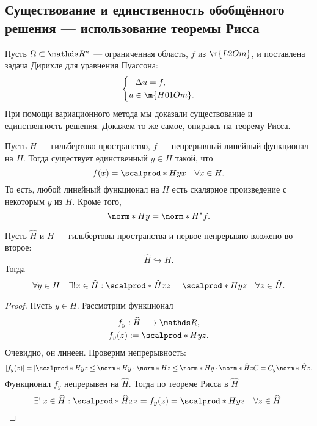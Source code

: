 \subsection{Существование и единственность обобщённого решения --- использование теоремы Рисса}

Пусть $\Omega \subset \real^n$ --- ограниченная область, $f$ из $\m{L2Om}$, и поставлена задача Дирихле для уравнения Пуассона:
\begin{align*}
\begin{cases*}
	- \Delta u = f, \\
	u \in \m{H01Om}.
\end{cases*}
\end{align*}
При помощи вариационного метода мы доказали существование и единственность решения. Докажем то же самое, опираясь на теорему Рисса.

\begin{reminder} Пусть $H$ --- гильбертово пространство, $f$ --- непрерывный линейный функционал на $H$. Тогда существует единственный $y \in H$ такой, что 
$$ f(x) = \scalprod*{H}{y}{x} \quad \forall x \in H.$$
То есть, любой линейный функционал на $H$ есть скалярное произведение с некоторым $y$ из $H$.
Кроме того,
$$ \norm*{H}{y} = \norm*{H^*}{f}.$$
\end{reminder}

\begin{lemma} Пусть $\widehat{H}$ и $H$ --- гильбертовы пространства и первое непрерывно вложено во второе:
$$ \widehat{H} \hookrightarrow H. $$
Тогда
$$ \forall y \in H \quad \exists ! x \in \widehat{H}: \scalprod*{\widehat{H}}{x}{z} = \scalprod*{H}{y}{z} \quad \forall z \in \widehat{H}.$$
\end{lemma}
\begin{proof}
Пусть $y \in H$. Рассмотрим функционал
\begin{gather*}
f_y : \widehat{H} \longrightarrow \real, \\
f_y(z) := \scalprod*{H}{y}{z}.
\end{gather*}
Очевидно, он линеен. Проверим непрерывность:
$$ |f_y(z)| = | \scalprod*{H}{y}{z} \leq \norm*{H}{y} \cdot \norm*{H}{z} \leq \norm*{H}{y} \cdot \norm*{\widehat{H}}{z} C = C_y \norm*{\widehat{H}}{z}.$$
Функционал $f_y$ непрерывен на $\widehat{H}$. Тогда по теореме Рисса в $\widehat{H}$
$$ \exists ! \, x \in \widehat{H}: \scalprod*{\widehat{H}}{x}{z} = f_y(z) = \scalprod*{H}{y}{z} \quad \forall z \in \widehat{H}.$$

\end{proof}

